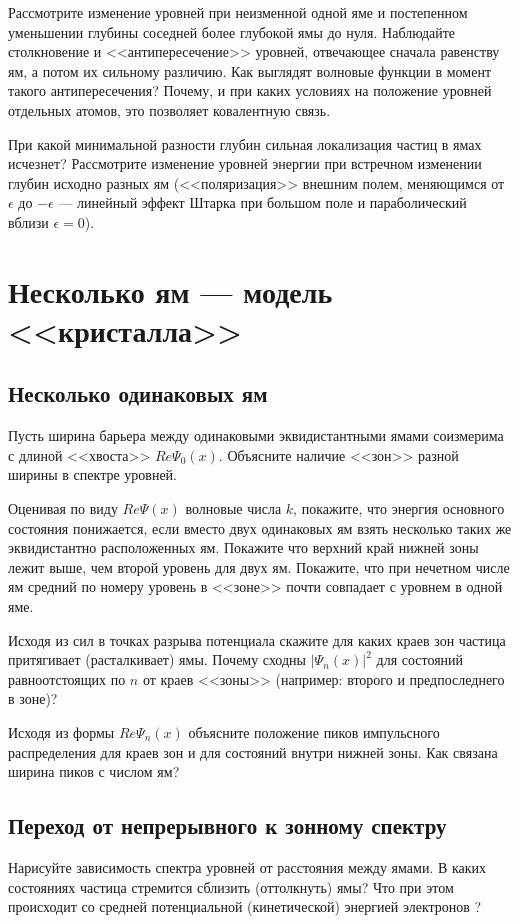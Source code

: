 \documentclass[12pt]{article}
\begin{document}
Рассмотрите  изменение  уровней при неизменной одной яме и
постепенном уменьшении глубины соседней более глубокой ямы
до нуля. Наблюдайте столкновение и <<антипересечение>> уровней,
отвечающее сначала равенству ям, а потом их сильному различию.
Как выглядят волновые функции в момент такого
антипересечения? Почему, и при каких условиях на положение
уровней отдельных атомов, это позволяет ковалентную связь.

При какой  минимальной разности глубин  сильная локализация
частиц в ямах исчезнет? Рассмотрите  изменение  уровней
энергии  при встречном изменении глубин исходно разных ям
(<<поляризация>> внешним полем, меняющимся от $\epsilon$ до
$-\epsilon$ --- линейный эффект Штарка при большом поле и
параболический вблизи $\epsilon=0$).

\hypertarget{N_well}{}\section[Несколько ям --- модель
кристалла]{Несколько ям --- модель <<кристалла>>}
\hypertarget{N_equal_well}{}\subsection{Несколько одинаковых ям}

Пусть ширина барьера между одинаковыми эквидистантными ямами
соизмерима с длиной <<хвоста>> $Re \Psi_0(x)$. Объясните наличие
<<зон>> разной ширины в  спектре уровней.

Оценивая по виду $Re \Psi(x)$  волновые числа $k$, покажите, что
энергия  основного  состояния  понижается,  если вместо двух
одинаковых  ям   взять  несколько  таких   же  эквидистантно
расположенных ям. Покажите что верхний край нижней зоны лежит
выше, чем  второй  уровень   для  двух  ям. Покажите, что
при нечетном числе ям средний по номеру уровень в <<зоне>> почти
совпадает с уровнем в одной яме.

Исходя из сил в точках разрыва потенциала
скажите для каких краев зон частица притягивает (расталкивает)
ямы. Почему сходны $|\Psi_n(x)|^2$ для  состояний
равноотстоящих  по  $n$  от  краев  <<зоны>> (например:  второго  и
предпоследнего в зоне)?

Исходя из формы $Re \Psi_n(x)$ объясните
положение пиков импульсного распределения для краев зон и для
состояний внутри нижней зоны. Как связана ширина пиков с числом
ям?

\hypertarget{continuous to band}{}\subsection{Переход от
непрерывного к зонному спектру}
Нарисуйте зависимость  спектра уровней от  расстояния между
ямами. В каких состояниях частица стремится сблизить
(оттолкнуть) ямы? Что при этом происходит со средней
потенциальной (кинетической) энергией электронов ?
\end{document}
